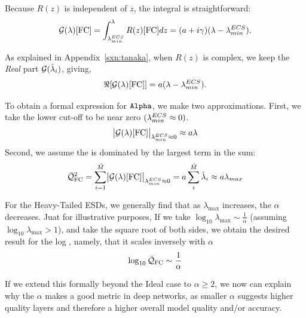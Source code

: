 Because $R(z)$ is independent of $z$, the integral is straightforward:
\begin{equation}
\label{eqn:free_cauchy_G}
\mathcal{G(\lambda)}[\mathrm{FC}] = \int_{\lambda^{ECS}_{min}}^{\lambda} R(z)[\mathrm{FC}]dz = (a + i\gamma)(\lambda - \lambda^{ECS}_{min}).
\end{equation}

As explained in Appendix~\ref{sxn:tanaka}, when $R(z)$ is complex,  we keep the \emph{Real} part $\mathcal{G}(\tilde{\lambda}_{i})$, giving,
\begin{equation}
\label{eqn:free_cauchy_G_abs}
\Re[\mathcal{G(\lambda)}[\mathrm{FC}]] = a(\lambda - \lambda^{ECS}_{min}).
\end{equation}

To obtain a formal expression for $\texttt{Alpha}$, we make two approximations.
First, we take the lower cut-off to be near zero $(\lambda^{ECS}_{min} \approx 0)$.
\begin{equation}
\label{eqn:free_cauchy_G_max}
\bigl|\mathcal{G(\lambda)}[\mathrm{FC}]\bigr|_{\lambda^{ECS}_{min} \approx 0} \approx a\lambda
\end{equation}
Second, we assume the \LayerQualitySquared is dominated by the largest term in the sum:
\begin{equation}
\label{eqn:free_cauchy_G_max2}
\bar{\mathcal{Q}}^{2}_{\mathrm{FC}} = \sum_{i=1}^{\tilde{M}}\bigl|\mathcal{G(\lambda)}[\mathrm{FC}]\bigr|_{\lambda^{ECS}_{min} \approx 0}
= a\sum_{i}^{\tilde{M}} \tilde{\lambda}_{i} \approx a\lambda_{max}
\end{equation}

For the Heavy-Tailed ESDs, we generally find that as $\lambda_{\max}$ increases, the \HTSR $\alpha$ decreases.
Juat for illustrative purposes,
If we take $\log_{10}\lambda_{\max}\sim\frac{1}{\alpha}$ (assuming $\log_{10}\lambda_{\max}>1$), and take the square root of both sides,
we obtain the desired result for the log \Quality, namely, that it scales inversely with $\alpha$
\begin{equation}
\label{eqn:free_cauchy_Q}
\log_{10}\bar{\mathcal{Q}}_{\mathrm{FC}} \sim \frac{1}{\alpha}
\end{equation}

If we extend this formally beyond the Ideal  case to $\alpha\ge 2$, we now can explain why the \HTSR $\alpha$
makes a good \LayerQuality metric in deep networks,
as smaller $\alpha$ suggests higher quality layers and therefore a higher overall model quality and/or accuracy. 


